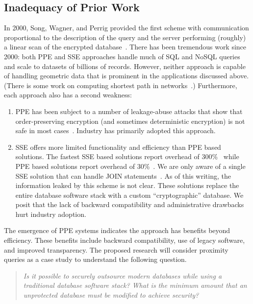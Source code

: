 \subsection{Inadequacy of Prior Work}

In 2000, Song, Wagner, and Perrig provided the first scheme with communication proportional to the description of the query and the server performing (roughly) a linear scan of the encrypted database~\cite{SP:SonWagPer00}.  There has been tremendous work since 2000: both PPE and SSE approaches handle much of SQL and NoSQL queries and scale to datasets of billions of records.  However, neither approach is capable of handling geometric data that is prominent in the applications discussed above. (There is some work on computing shortest path in networks~\cite{CCS:MKNK15}.)  Furthermore, each approach also has a second weakness:
\begin{enumerate}
\item PPE has been subject to a number of leakage-abuse attacks that show that order-preserving encryption (and sometimes deterministic encryption) is not safe in most cases~\cite{CCS:NavKamWri15,CCS:CGPR15,CCS:KKNO16,CCS:PouWri16,CCS:GMNRS16,EPRINT:GSBNR16,EPRINT:ZhaKatPap16}.  Industry has primarily adopted this approach.
\item SSE offers more limited functionality and efficiency than PPE based solutions.  The fastest SSE based solutions report overhead of 300\%~\cite{C:CJJKRS13,CCS:JJKRS13,NDSS:CJJJKR14,ESORICS:FJKNRS15} while PPE based solutions report overhead of 30\%~\cite{CACM:PRZB12}.  We are only aware of a single SSE solution that can handle JOIN statements~\cite{EPRINT:KamMoa16}.  As of this writing, the information  leaked by this scheme is not clear.  These solutions replace the entire database software stack with a custom ``cryptographic'' database.  We posit that the lack of backward compatibility and administrative drawbacks hurt industry adoption.  
\end{enumerate}

The emergence of PPE systems indicates the approach has benefits beyond efficiency.  These benefits include backward compatibility, use of legacy software, and improved transparency.
The proposed research will
consider proximity queries as a case study to understand the following
question.  \begin{quote}\emph{Is it possible to securely outsource
modern databases while using a traditional database software stack?
What is the minimum amount that an unprotected database must be modified
to achieve security?}\end{quote}


